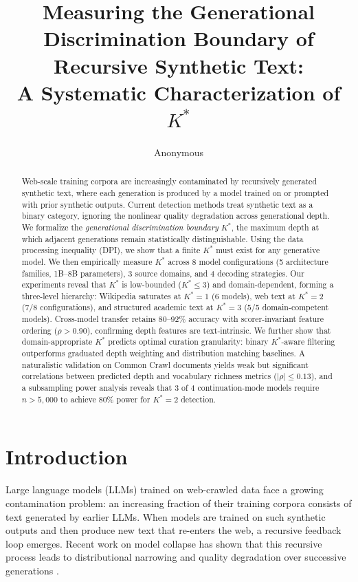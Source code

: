 \documentclass[11pt,a4paper]{article}
\title{Measuring the Generational Discrimination Boundary of Recursive Synthetic Text: \\A Systematic Characterization of $K^*$}
\author{Anonymous}
\date{}
\begin{document}
\maketitle

\begin{abstract}
Web-scale training corpora are increasingly contaminated by recursively generated synthetic text, where each generation is produced by a model trained on or prompted with prior synthetic outputs. Current detection methods treat synthetic text as a binary category, ignoring the nonlinear quality degradation across generational depth. We formalize the \emph{generational discrimination boundary} $K^*$, the maximum depth at which adjacent generations remain statistically distinguishable. Using the data processing inequality (DPI), we show that a finite $K^*$ must exist for any generative model. We then empirically measure $K^*$ across 8 model configurations (5 architecture families, 1B--8B parameters), 3 source domains, and 4 decoding strategies. Our experiments reveal that $K^*$ is low-bounded ($K^* \leq 3$) and domain-dependent, forming a three-level hierarchy: Wikipedia saturates at $K^*=1$ (6 models), web text at $K^*=2$ (7/8 configurations), and structured academic text at $K^*=3$ (5/5 domain-competent models). Cross-model transfer retains 80--92\% accuracy with scorer-invariant feature ordering ($\rho > 0.90$), confirming depth features are text-intrinsic. We further show that domain-appropriate $K^*$ predicts optimal curation granularity: binary $K^*$-aware filtering outperforms graduated depth weighting and distribution matching baselines. A naturalistic validation on Common Crawl documents yields weak but significant correlations between predicted depth and vocabulary richness metrics ($|\rho| \leq 0.13$), and a subsampling power analysis reveals that 3 of 4 continuation-mode models require $n > 5{,}000$ to achieve 80\% power for $K^*=2$ detection.
\end{abstract}

\section{Introduction}

Large language models (LLMs) trained on web-crawled data face a growing contamination problem: an increasing fraction of their training corpora consists of text generated by earlier LLMs. When models are trained on such synthetic outputs and then produce new text that re-enters the web, a recursive feedback loop emerges. Recent work on model collapse has shown that this recursive process leads to distributional narrowing and quality degradation over successive generations \citep{shumailov2024model,alemohammad2024selfconsuming,dohmatob2024tale}.
\end{document}

